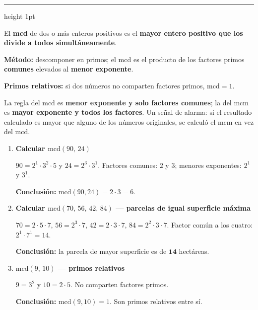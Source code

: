 \documentclass[11pt, letterpaper]{article}
\newcommand{\subbloque}[1]{%
  \vspace{14pt}
  \noindent{\large\bfseries\color{zenitnavy} #1}\par
  \vspace{4pt}\hrule height 1pt\vspace{8pt}}
\begin{document}
\subbloque{4.3 M\'aximo com\'un divisor (mcd)}
\label{sub:4.3}

\begin{tcolorbox}[importantbox, title={M\'aximo com\'un divisor}]
El \textbf{mcd} de dos o m\'as enteros positivos es el \textbf{mayor entero positivo que los divide a todos simult\'aneamente}.

\textbf{M\'etodo:} descomponer en primos; el mcd es el producto de los factores primos \textbf{comunes} elevados al \textbf{menor exponente}.

\textbf{Primos relativos:} si dos n\'umeros no comparten factores primos, $\text{mcd}=1$.
\end{tcolorbox}

\begin{tcolorbox}[warningbox, title={Error frecuente --- confundir mcd con mcm}]
La regla del mcd es \textbf{menor exponente y solo factores comunes}; la del mcm es \textbf{mayor exponente y todos los factores}. Un se\~nal de alarma: si el resultado calculado es mayor que alguno de los n\'umeros originales, se calcul\'o el mcm en vez del mcd.
\end{tcolorbox}

\begin{tcolorbox}[examplebox, title={Ejemplos --- c\'alculo del mcd}]
\begin{enumerate}[label=\textbf{Ej. \arabic*.}, leftmargin=*, itemsep=12pt]

\item \textbf{Calcular $\text{mcd}(90,\,24)$}

$90=2^1\cdot 3^2\cdot 5$ y $24=2^3\cdot 3^1$. Factores comunes: $2$ y $3$; menores exponentes: $2^1$ y $3^1$.

\textbf{Conclusi\'on:} $\text{mcd}(90,24)=2\cdot 3=6$.

\item \textbf{Calcular $\text{mcd}(70,\,56,\,42,\,84)$ --- parcelas de igual superficie m\'axima}

$70=2\cdot 5\cdot 7$, $56=2^3\cdot 7$, $42=2\cdot 3\cdot 7$, $84=2^2\cdot 3\cdot 7$. Factor com\'un a los cuatro: $2^1\cdot 7^1=14$.

\textbf{Conclusi\'on:} la parcela de mayor superficie es de $\mathbf{14}$ hect\'areas.

\item \textbf{$\text{mcd}(9,\,10)$ --- primos relativos}

$9=3^2$ y $10=2\cdot 5$. No comparten factores primos.

\textbf{Conclusi\'on:} $\text{mcd}(9,10)=1$. Son primos relativos entre s\'i.

\end{enumerate}
\end{tcolorbox}
\end{document}
